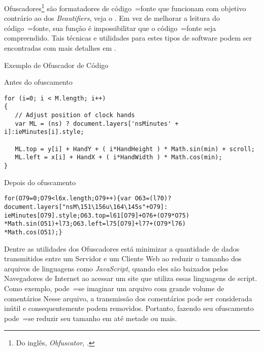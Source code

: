 Ofuscadores\footnote{Do inglês,
\textit{Obfuscator},
.
}
são formatadores de código~=fonte que funcionam com objetivo contrário ao dos \textit{Beautifiers},
veja o .
Em vez de melhorar a leitura do código~=fonte,
sua função é impossibilitar que o código~=fonte seja compreendido.
Tais técnicas e
utilidades para estes tipos de software podem ser encontradas com mais detalhes em .
\begin{quadro}[!htb]
\caption[Exemplo de Ofuscador de Código]{Exemplo de Ofuscador de Código \cite{familyOfSourceCodeObfuscators}}
\label{exemploDeOfuscador}
\begin{bluebox}
\begin{code}
\caption{Antes do ofuscamento}
\begin{verbatim}
for (i=0; i < M.length; i++)
{
   // Adjust position of clock hands
   var ML = (ns) ? document.layers['nsMinutes' + i]:ieMinutes[i].style;

   ML.top = y[i] + HandY + ( i*HandHeight ) * Math.sin(min) + scroll;
   ML.left = x[i] + HandX + ( i*HandWidth ) * Math.cos(min);
}
\end{verbatim}
\end{code}

\begin{code}
\caption{Depois do ofuscamento}
\begin{verbatim}
for(O79=0;O79<l6x.length;O79++){var O63=(l70)?
document.layers["nsM\151\156u\164\145s"+O79]:
ieMinutes[O79].style;O63.top=l61[O79]+O76+(O79*O75)
*Math.sin(O51)+l73;O63.left=l75[O79]+l77+(O79*l76)
*Math.cos(O51);}
\end{verbatim}
\end{code}
\end{bluebox}
\end{quadro}

Dentre as utilidades dos Ofuscadores está minimizar a quantidade de dados transmitidos entre um Servidor e
um Cliente Web ao reduzir o tamanho dos arquivos de linguagens como \textit{JavaScript},
quando eles são baixados pelos Navegadores de Internet ao acessar um site que utiliza essas linguagens de script.
Como exemplo,
pode~=se imaginar um arquivo com grande volume de comentários Nesse arquivo,
a transmissão dos comentários pode ser considerada inútil e
consequentemente podem removidos.
Portanto,
fazendo seu ofuscamento pode~=se reduzir seu tamanho em até metade ou
mais.

